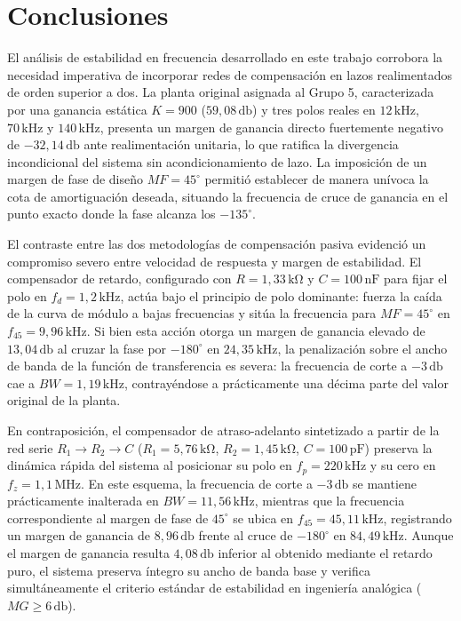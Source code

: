 \chapter{Conclusiones}

El análisis de estabilidad en frecuencia desarrollado en este trabajo corrobora la necesidad imperativa de incorporar
redes de compensación en lazos realimentados de orden superior a dos. La planta original asignada al Grupo 5, caracterizada
por una ganancia estática $K = 900$ ($59,08\,\si{\decibel}$) y tres polos reales en $12\,\si{\kilo\hertz}$, $70\,\si{\kilo\hertz}$ y
$140\,\si{\kilo\hertz}$, presenta un margen de ganancia directo fuertemente negativo de $-32,14\,\si{\decibel}$ ante realimentación
unitaria, lo que ratifica la divergencia incondicional del sistema sin acondicionamiento de lazo. La imposición de un margen
de fase de diseño $MF = 45^\circ$ permitió establecer de manera unívoca la cota de amortiguación deseada, situando la
frecuencia de cruce de ganancia en el punto exacto donde la fase alcanza los $-135^\circ$.

El contraste entre las dos metodologías de compensación pasiva evidenció un compromiso severo entre velocidad de respuesta y
margen de estabilidad. El compensador de retardo, configurado con $R = 1,33\,\si{\kilo\ohm}$ y $C = 100\,\si{\nano\farad}$ para fijar
el polo en $f_d = 1,2\,\si{\kilo\hertz}$, actúa bajo el principio de polo dominante: fuerza la caída de la curva de módulo a bajas
frecuencias y sitúa la frecuencia para $MF = 45^\circ$ en $f_{45} = 9,96\,\si{\kilo\hertz}$. Si bien esta acción otorga un margen de
ganancia elevado de $13,04\,\si{\decibel}$ al cruzar la fase por $-180^\circ$ en $24,35\,\si{\kilo\hertz}$, la penalización sobre el
ancho de banda de la función de transferencia es severa: la frecuencia de corte a $-3\,\si{\decibel}$ cae a $BW = 1,19\,\si{\kilo\hertz}$,
contrayéndose a prácticamente una décima parte del valor original de la planta.

En contraposición, el compensador de atraso-adelanto sintetizado a partir de la red serie $R_1 \to R_2 \to C$ ($R_1 = 5,76\,\si{\kilo\ohm}$,
$R_2 = 1,45\,\si{\kilo\ohm}$, $C = 100\,\si{\pico\farad}$) preserva la dinámica rápida del sistema al posicionar su polo en
$f_p = 220\,\si{\kilo\hertz}$ y su cero en $f_z = 1,1\,\si{\mega\hertz}$. En este esquema, la frecuencia de corte a $-3\,\si{\decibel}$
se mantiene prácticamente inalterada en $BW = 11,56\,\si{\kilo\hertz}$, mientras que la frecuencia correspondiente al margen de fase
de $45^\circ$ se ubica en $f_{45} = 45,11\,\si{\kilo\hertz}$, registrando un margen de ganancia de $8,96\,\si{\decibel}$ frente al cruce
de $-180^\circ$ en $84,49\,\si{\kilo\hertz}$. Aunque el margen de ganancia resulta $4,08\,\si{\decibel}$ inferior al obtenido mediante
el retardo puro, el sistema preserva íntegro su ancho de banda base y verifica simultáneamente el criterio estándar de estabilidad
en ingeniería analógica ($MG \ge 6\,\si{\decibel}$).

